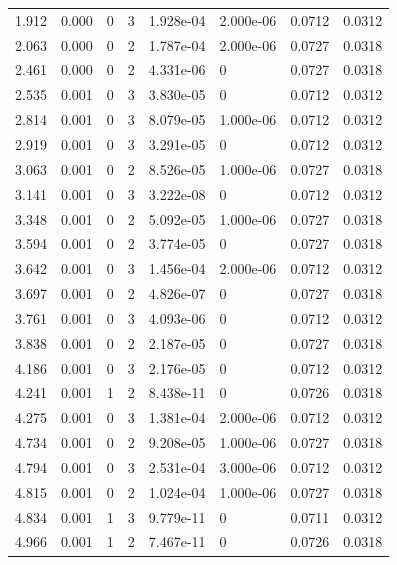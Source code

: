 \documentclass[preview]{standalone}
\begin{document}
{{\begin{tabular}{L{1.2cm}C{1.2cm} C{0.3cm}C{0.5cm} C{1.4cm}C{1.4cm} C{1.4cm}C{1.4cm}}
  1.912  &  0.000  & 0     &  3 &  1.928e-04  & 2.000e-06  & 0.0712 &  0.0312   \\ 
  2.063  &  0.000  & 0     &  2 &  1.787e-04  & 2.000e-06  & 0.0727 &  0.0318   \\ 
  2.461  &  0.000  & 0     &  2 &  4.331e-06  & 0  & 0.0727 &  0.0318   \\ 
  2.535  &  0.001  & 0     &  3 &  3.830e-05  & 0  & 0.0712 &  0.0312   \\ 
  2.814  &  0.001  & 0     &  3 &  8.079e-05  & 1.000e-06  & 0.0712 &  0.0312   \\ 
  2.919  &  0.001  & 0     &  3 &  3.291e-05  & 0  & 0.0712 &  0.0312   \\ 
  3.063  &  0.001  & 0     &  2 &  8.526e-05  & 1.000e-06  & 0.0727 &  0.0318   \\ 
  3.141  &  0.001  & 0     &  3 &  3.222e-08  & 0  & 0.0712 &  0.0312   \\ 
  3.348  &  0.001  & 0     &  2 &  5.092e-05  & 1.000e-06  & 0.0727 &  0.0318   \\ 
  3.594  &  0.001  & 0     &  2 &  3.774e-05  & 0  & 0.0727 &  0.0318   \\ 
  3.642  &  0.001  & 0     &  3 &  1.456e-04  & 2.000e-06  & 0.0712 &  0.0312   \\ 
  3.697  &  0.001  & 0     &  2 &  4.826e-07  & 0  & 0.0727 &  0.0318   \\ 
  3.761  &  0.001  & 0     &  3 &  4.093e-06  & 0  & 0.0712 &  0.0312   \\ 
  3.838  &  0.001  & 0     &  2 &  2.187e-05  & 0  & 0.0727 &  0.0318   \\ 
  4.186  &  0.001  & 0     &  3 &  2.176e-05  & 0  & 0.0712 &  0.0312   \\ 
  4.241  &  0.001  & 1     &  2 &  8.438e-11  & 0  & 0.0726 &  0.0318   \\ 
  4.275  &  0.001  & 0     &  3 &  1.381e-04  & 2.000e-06  & 0.0712 &  0.0312   \\ 
  4.734  &  0.001  & 0     &  2 &  9.208e-05  & 1.000e-06  & 0.0727 &  0.0318   \\ 
  4.794  &  0.001  & 0     &  3 &  2.531e-04  & 3.000e-06  & 0.0712 &  0.0312   \\ 
  4.815  &  0.001  & 0     &  2 &  1.024e-04  & 1.000e-06  & 0.0727 &  0.0318   \\ 
  4.834  &  0.001  & 1     &  3 &  9.779e-11  & 0  & 0.0711 &  0.0312   \\ 
  4.966  &  0.001  & 1     &  2 &  7.467e-11  & 0  & 0.0726 &  0.0318   \\ 

\end{tabular}}}
\end{document}
